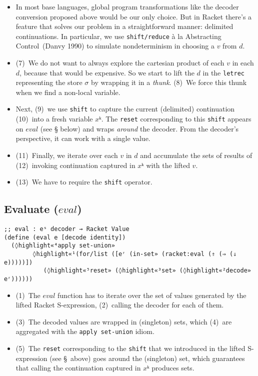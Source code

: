 \documentclass[12pt, oneside]{book}
\begin{document}
\begin{itemize}
  \item In most base languages, global program transformations like the decoder conversion proposed above would be our only choice. But in Racket there’s a feature that solves our problem in a straightforward manner: delimited continuations. In particular, we use \texttt{shift/reduce} à la Abstracting Control~(Danvy 1990) to simulate nondeterminism in choosing a \(v\) from \(d\).
  \item (7)~We do not want to always explore the cartesian product of each \(v\) in each \(d\), because that would be expensive. So we start to lift the \(d\) in the \texttt{letrec} representing the store \(σ\) by wrapping it in a \emph{thunk}. (8)~We force this thunk when we find a non-local variable.
  \item Next, (9)~we use \texttt{shift} to capture the current (delimited) continuation (10)~into a fresh variable \(xᵏ\). The \texttt{reset} corresponding to this \texttt{shift} appears on \(eval\) (see § below) and wraps \emph{around} the decoder. From the decoder’s perspective, it can work with a single value.
  \item (11)~Finally, we iterate over each \(v\) in \(d\) and accumulate the sets of results of (12)~invoking continuation captured in \(xᵏ\) with the lifted \(v\).
  \item (13)~We have to require the \texttt{shift} operator.
\end{itemize}

\subsection{Evaluate (\(eval\))}

\begin{Verbatim}
;; eval : eˢ decoder → Racket Value
(define (eval e [decode identity])
  (◊highlight«⁴apply set-union»
        ◊highlight«¹(for/list ([eʳ (in-set» (racket:eval (⇑ (⇒ (⇓ e)))))])
           (◊highlight«⁵reset» (◊highlight«³set» (◊highlight«²decode» eʳ))))))
\end{Verbatim}

\begin{itemize}
  \item (1)~The \(eval\) function has to iterate over the set of values generated by the lifted Racket S-expression, (2)~calling the decoder for each of them.
  \item (3)~The decoded values are wrapped in (singleton) sets, which (4)~are aggregated with the \texttt{apply set-union} idiom.
  \item (5)~The \texttt{reset} corresponding to the \texttt{shift} that we introduced in the lifted S-expression (see §~above) goes around the (singleton) set, which guarantees that calling the continuation captured in \(xᵏ\) produces sets.
\end{itemize}
\end{document}

